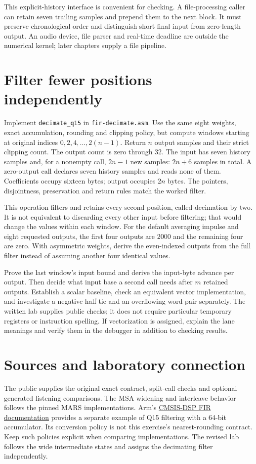 This explicit-history interface is convenient for checking. A file-processing
caller can retain seven trailing samples and prepend them to the next block.
It must preserve chronological order and distinguish short final input from
zero-length output. An audio device, file parser and real-time deadline are
outside the numerical kernel; later chapters supply a file pipeline.

\section{Filter fewer positions independently}

Implement \texttt{decimate\_q15} in \texttt{fir-decimate.asm}. Use the same eight
weights, exact accumulation, rounding and clipping policy, but compute windows
starting at original indices $0,2,4,\ldots,2(n-1)$. Return $n$ output samples
and their strict clipping count. The output count is zero through 32. The input
has seven history samples and, for a nonempty call, $2n-1$ new samples: $2n+6$
samples in total. A zero-output call declares seven history samples and reads
none of them. Coefficients occupy sixteen bytes; output occupies $2n$ bytes.
The pointers, disjointness, preservation and return rules match the worked filter.

This operation filters and retains every second position, called decimation by
two. It is not equivalent to discarding every other input before filtering;
that would change the values within each window. For the default averaging
impulse and eight requested outputs, the first four outputs are 2000 and the
remaining four are zero. With asymmetric weights, derive the even-indexed
outputs from the full filter instead of assuming another four identical values.

Prove the last window's input bound and derive the input-byte advance per output.
Then decide what input base a second call needs after $m$ retained outputs.
Establish a scalar baseline, check an equivalent vector implementation, and
investigate a negative half tie and an overflowing word pair separately. The
written lab supplies public checks; it does not require particular temporary
registers or instruction spelling. If vectorization is assigned, explain the
lane meanings and verify them in the debugger in addition to checking results.

\section*{Sources and laboratory connection}
The public  supplies the original exact
contract, split-call checks and optional generated listening comparisons.
The MSA widening and interleave behavior follows the pinned MARS implementations.
Arm's \href{https://arm-software.github.io/CMSIS-DSP/latest/group__FIR.html}{CMSIS-DSP FIR documentation}
provides a separate example of Q15 filtering with a 64-bit accumulator. Its
conversion policy is not this exercise's nearest-rounding contract. Keep such
policies explicit when comparing implementations. The revised lab follows the
wide intermediate states and assigns the decimating filter independently.
